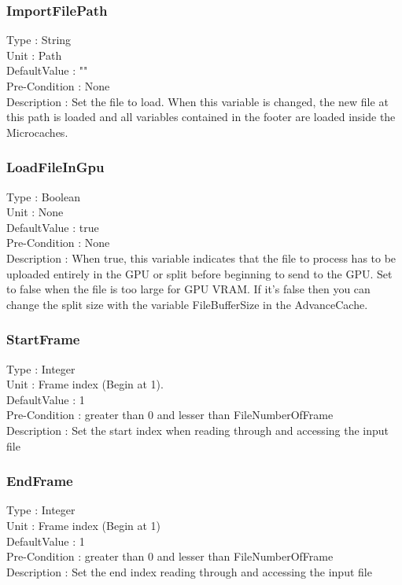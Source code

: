 \subsubsection{ImportFilePath}
\noindent
Type : String\\
Unit : Path\\
DefaultValue : ""\\
Pre-Condition : None\\
Description : Set the file to load. When this variable is changed, the new file at this path is loaded and all variables contained in the footer are loaded inside the Microcaches.

\subsubsection{LoadFileInGpu}
\noindent
Type : Boolean \\
Unit : None\\
DefaultValue : true \\
Pre-Condition : None\\
Description : When true, this variable indicates that the file to process has to be uploaded entirely in the GPU or split before beginning to send to the GPU. Set to false when the file is too large for GPU VRAM. If it's false then you can change the split size with the variable FileBufferSize in the AdvanceCache.

\subsubsection{StartFrame}
\noindent
Type : Integer \\
Unit : Frame index (Begin at 1). \\
DefaultValue : 1 \\
Pre-Condition : greater than 0 and lesser than FileNumberOfFrame\\
Description : Set the start index when reading through and accessing the input file\\

\subsubsection{EndFrame}
\noindent
Type : Integer\\
Unit : Frame index (Begin at 1)\\
DefaultValue : 1\\
Pre-Condition : greater than 0 and lesser than FileNumberOfFrame\\
Description : Set the end index reading through and accessing the input file\\


